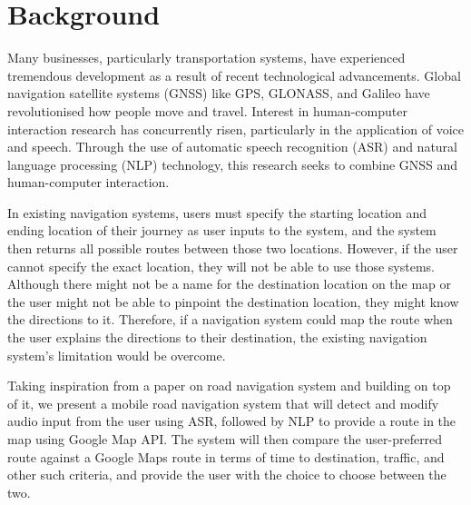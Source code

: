 \documentclass{epsrc}
\begin{document}
\part{Background}




\vspace{5pt}

Many businesses, particularly transportation systems, have experienced tremendous development as a result of recent technological advancements. Global navigation satellite systems (GNSS) like GPS, GLONASS, and Galileo have revolutionised how people move and travel. Interest in human-computer interaction research has concurrently risen, particularly in the application of voice and speech. Through the use of automatic speech recognition (ASR) and natural language processing (NLP) technology, this research seeks to combine GNSS and human-computer interaction.
\vspace{5pt}

In existing navigation systems, users must specify the starting location and ending location of their journey as user inputs to the system, and the system then returns all possible routes between those two locations. However, if the user cannot specify the exact location, they will not be able to use those systems. Although there might not be a name for the destination location on the map or the user might not be able to pinpoint the destination location, they might know the directions to it. Therefore, if a navigation system could map the route when the user explains the directions to their destination, the existing navigation system's limitation would be overcome. 
\vspace{5pt}

Taking inspiration from a paper on road navigation system\cite{8629859} and building on top of it, we present a mobile road navigation system that will detect and modify audio input from the user using ASR, followed by NLP to provide a route in the map using Google Map API. The system will then compare the user-preferred route against a Google Maps route in terms of time to destination, traffic, and other such criteria, and provide the user with the choice to choose between the two. 
\vspace{5pt}
\end{document}
